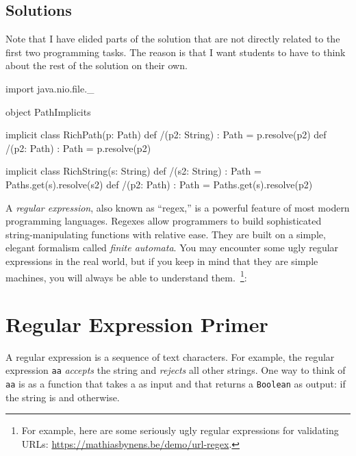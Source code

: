 \documentclass[9pt]{extbook}
\begin{document}
\begin{instructor}
\section{Solutions}
  
Note that I have elided parts of the solution that are not directly related to the first two programming tasks.  The reason is that I want students to have to think about the rest of the solution on their own.

\begin{scalacode}
  import java.nio.file._

  object PathImplicits {  
    implicit class RichPath(p: Path) {
      def /(p2: String) : Path = p.resolve(p2)
      def /(p2: Path) : Path = p.resolve(p2)
    }

    implicit class RichString(s: String) {
      def /(s2: String) : Path = Paths.get(s).resolve(s2)
      def /(p2: Path) : Path = Paths.get(s).resolve(p2)
    }
  }
\end{scalacode}
  
\end{instructor}



A \emph{regular expression}, also known as ``regex,'' is a powerful feature of most modern programming languages.  Regexes allow programmers to build sophisticated string-manipulating functions with relative ease.  They are built on a simple, elegant formalism called \emph{finite automata}.  You may encounter some ugly regular expressions in the real world, but if you keep in mind that they are simple machines, you will always be able to understand them.~\footnote{For example, here are some seriously ugly regular expressions for validating URLs: \url{https://mathiasbynens.be/demo/url-regex}.}:

\section{Regular Expression Primer}

A regular expression is a sequence of text characters.  For example, the regular expression \texttt{aa} \emph{accepts} the string  and \emph{rejects} all other strings.  One way to think of \texttt{aa} is as a function that takes a  as input and that returns a \texttt{Boolean} as output:  if the string is  and  otherwise.
\end{document}
